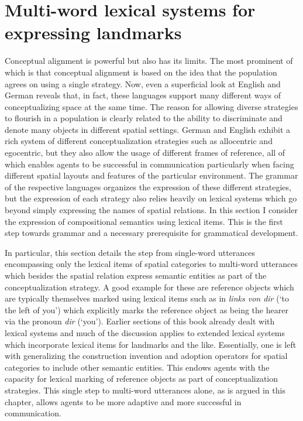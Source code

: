 % 

\chapter{Multi-word lexical systems for expressing landmarks}
\label{s:multi-word}
Conceptual alignment is powerful but also has its limits. The most prominent of which
is that conceptual alignment is based on the idea that the population agrees on using a 
single strategy. Now, even a superficial look at English and German reveals that, in fact, 
these languages support many different ways of conceptualizing space at the same time. 
The reason for allowing diverse strategies to flourish in a population is clearly related to 
the ability to discriminate and denote many objects in different spatial settings.
German and English exhibit a rich system of different conceptualization
strategies such as allocentric and egocentric, but they also allow the usage of different frames of reference,
all of which enables agents to be successful in communication particularly when facing different spatial layouts 
and features of the particular environment. The grammar of the respective languages organizes
the expression of these different strategies, but the expression of each strategy also relies heavily on 
lexical systems which go beyond simply expressing the names of spatial relations. 
In this section I consider the expression of compositional semantics using lexical items. 
This is the first step towards grammar and a necessary prerequisite for grammatical development. 

In particular, this section details the step from single-word utterances encompassing only the lexical 
items of spatial categories to multi-word utterances which besides the spatial relation express 
semantic entities as part of the conceptualization strategy. A good example for these are
reference objects which are typically themselves marked using lexical items such as 
in \textit{links von dir} (`to the left of you') which explicitly marks the reference object as being
the hearer via the pronoun \textit{dir} (`you'). Earlier sections of this book already 
dealt with lexical systems and much of the discussion applies to extended lexical systems which 
incorporate lexical items for landmarks and the like. Essentially, one is 
left with generalizing the construction invention and adoption operators for spatial 
categories to include other semantic entities. This endows agents with the capacity for lexical marking 
of reference objects as part of conceptualization strategies. This single step to 
multi-word utterances alone, as is argued in this chapter, allows agents to be 
more adaptive and more successful in communication.

